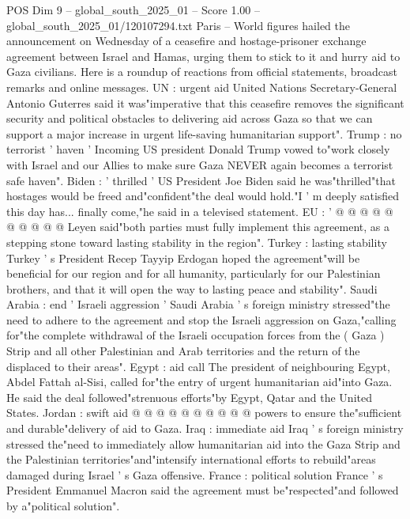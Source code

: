 \begin{textsample}{POS Dim 9 – global\_south\_2025\_01 – Score 1.00 – global\_south\_2025\_01/120107294.txt}  \label{ex:f9_pos_348}
Paris -- World figures hailed the announcement on Wednesday of a ceasefire and hostage-prisoner exchange agreement between Israel and Hamas, urging them to stick to it and hurry aid to Gaza civilians.
Here is a roundup of reactions from official statements, broadcast remarks and online messages.
UN : urgent aid United Nations Secretary-General Antonio Guterres said it was"imperative that this ceasefire removes the significant security and political obstacles to delivering aid across Gaza so that we can support a major increase in urgent life-saving humanitarian support".
Trump : no terrorist ' haven ' Incoming US president Donald Trump vowed to"work closely with Israel and our Allies to make sure Gaza NEVER again becomes a terrorist safe haven".
Biden : ' thrilled ' US President Joe Biden said he was"thrilled"that hostages would be freed and"confident"the deal would hold."I ' m deeply satisfied this day has... finally come,"he said in a televised statement.
EU : ' @ @ @ @ @ @ @ @ @ @ Leyen said"both parties must fully implement this agreement, as a stepping stone toward lasting stability in the region".
Turkey : lasting stability Turkey ' s President Recep Tayyip Erdogan hoped the agreement"will be beneficial for our region and for all humanity, particularly for our Palestinian brothers, and that it will open the way to lasting peace and stability".
Saudi Arabia : end ' Israeli aggression ' Saudi Arabia ' s foreign ministry stressed"the need to adhere to the agreement and stop the Israeli aggression on Gaza,"calling for"the complete withdrawal of the Israeli occupation forces from the ( Gaza ) Strip and all other Palestinian and Arab territories and the return of the displaced to their areas".
Egypt : aid call The president of neighbouring Egypt, Abdel Fattah al-Sisi, called for"the entry of urgent humanitarian aid"into Gaza.
He said the deal followed"strenuous efforts"by Egypt, Qatar and the United States.
Jordan : swift aid @ @ @ @ @ @ @ @ @ @ powers to ensure the"sufficient and durable"delivery of aid to Gaza.
Iraq : immediate aid Iraq ' s foreign ministry stressed the"need to immediately allow humanitarian aid into the Gaza Strip and the Palestinian territories"and"intensify international efforts to rebuild"areas damaged during Israel ' s Gaza offensive.
France : political solution France ' s President Emmanuel Macron said the agreement must be"respected"and followed by a"political solution".

\end{textsample}
